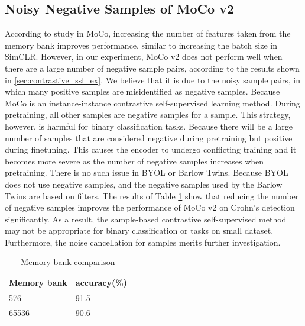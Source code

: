 \documentclass[conference]{IEEEtran}
\begin{document}
\subsection{Noisy Negative Samples of MoCo v2}
\label{sec:disscussion_moco}
According to study in MoCo\cite{he2019moco}, increasing the number of features taken from the memory bank improves performance, similar to increasing the batch size in SimCLR. However, in our experiment, MoCo v2 does not perform well when there are a large number of negative sample pairs, according to the results shown in \ref{sec:contrastive_ssl_ex}. 
We believe that it is due to the noisy sample pairs, in which many positive samples are misidentified as negative samples. 
Because MoCo is an instance-instance contrastive self-supervised learning method. 
During pretraining, all other samples are negative samples for a sample. This strategy, however, is harmful for binary classification tasks. 
Because there will be a large number of samples that are considered negative during pretraining but positive during finetuning. 
This causes the encoder to undergo conflicting training and it becomes more severe as the number of negative samples increases when pretraining.
There is no such issue in BYOL or Barlow Twins. Because BYOL does not use negative samples, and the negative samples used by the Barlow Twins are based on filters. The results of Table \ref{tab:dis_memorybank} show that reducing the number of negative samples improves the performance of MoCo v2 on Crohn's detection significantly.
As a result, the sample-based contrastive self-supervised method may not be appropriate for binary classification or tasks on small dataset. Furthermore, the noise cancellation for samples merits further investigation.
\begin{table}
\centering
\caption{Memory bank comparison}
\label{tab:dis_memorybank}
\begin{tabular}{l|l} 
\hline
Memory bank & accuracy(\%)  \\ 
\hline
576         & 91.5          \\
65536       & 90.6          \\
\hline
\end{tabular}
\end{table}
\end{document}
